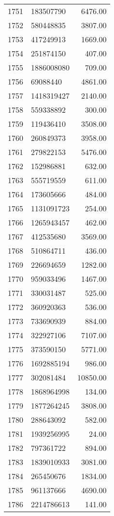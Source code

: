 \begin{table}[ht]
\begin{tabular}{rlr}
  1751 & 183507790 & 6476.00 \\ 
  1752 & 580448835 & 3807.00 \\ 
  1753 & 417249913 & 1669.00 \\ 
  1754 & 251874150 & 407.00 \\ 
  1755 & 1886008080 & 709.00 \\ 
  1756 & 69088440 & 4861.00 \\ 
  1757 & 1418319427 & 2140.00 \\ 
  1758 & 559338892 & 300.00 \\ 
  1759 & 119436410 & 3508.00 \\ 
  1760 & 260849373 & 3958.00 \\ 
  1761 & 279822153 & 5476.00 \\ 
  1762 & 152986881 & 632.00 \\ 
  1763 & 555719559 & 611.00 \\ 
  1764 & 173605666 & 484.00 \\ 
  1765 & 1131091723 & 254.00 \\ 
  1766 & 1265943457 & 462.00 \\ 
  1767 & 412535680 & 3569.00 \\ 
  1768 & 510864711 & 436.00 \\ 
  1769 & 226694659 & 1282.00 \\ 
  1770 & 959033496 & 1467.00 \\ 
  1771 & 330031487 & 525.00 \\ 
  1772 & 360920363 & 536.00 \\ 
  1773 & 733690939 & 884.00 \\ 
  1774 & 322927106 & 7107.00 \\ 
  1775 & 373590150 & 5771.00 \\ 
  1776 & 1692885194 & 986.00 \\ 
  1777 & 302081484 & 10850.00 \\ 
  1778 & 1868964998 & 134.00 \\ 
  1779 & 1877264245 & 3808.00 \\ 
  1780 & 288643092 & 582.00 \\ 
  1781 & 1939256995 & 24.00 \\ 
  1782 & 797361722 & 894.00 \\ 
  1783 & 1839010933 & 3081.00 \\ 
  1784 & 265450676 & 1834.00 \\ 
  1785 & 961137666 & 4690.00 \\ 
  1786 & 2214786613 & 141.00 \\ 

\end{tabular}
\end{table}
